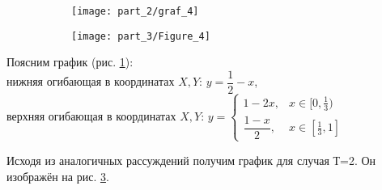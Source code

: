 \begin{figure}[H]
	\centering
	\begin{subfigure}[b]{0.47 \textwidth}
		\centering		
		\texttt{[image: part\_2/graf\_4]}
		\caption{}
		\label{fig:EG_1}
	\end{subfigure}	
	\begin{subfigure}[b]{0.47 \textwidth}
		\centering		
		\texttt{[image: part\_3/Figure\_4]}
		\caption{}
		\label{fig:EG_2}
	\end{subfigure}
	\caption{}	
\end{figure}

\begin{flushleft}
	Поясним график (рис. \ref{fig:EG_1}): \\
	нижняя огибающая в координатах $X,Y$: $y=\dfrac{1}{2}-x$, \\
	верхняя огибающая в координатах $X,Y$: 
	$y=
	\begin{cases}
		1 - 2x, & x \in [0, \frac{1}{3}) \\
		\dfrac{1 - x}{2}, & x \in [\frac{1}{3}, 1]
	\end{cases}
$
\end{flushleft}

Исходя из аналогичных рассуждений получим график для случая Т=2. 
Он изображён на рис. \ref{fig:EG_2}.

